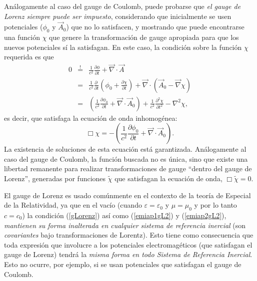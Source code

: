 Análogamente al caso del gauge de Coulomb, puede probarse que \textit{el gauge de Lorenz siempre puede ser impuesto}, considerando que inicialmente se usen potenciales ($\phi_0$ y $\vec{A}_0$) que no lo satisfacen, y mostrando que puede encontrarse una función $\chi$ que genere la transformación de gauge apropiada para que los nuevos potenciales sí la satisfagan. En este caso, la condición sobre la función $\chi$ requerida es que
\begin{eqnarray}
0&\stackrel{!}{=}&\frac{1}{c^2}\frac{\partial\phi}{\partial t}+\vec{\nabla}\cdot\vec{A} \\
&=&\frac{1}{c^2}\frac{\partial\ }{\partial t}\left(\phi_0+\frac{\partial\chi}{\partial t}\right)+\vec{\nabla}\cdot\left(\vec{A}_0-\vec\nabla\chi\right) \\
&=&\left(\frac{1}{c^2}\frac{\partial\phi_0}{\partial t} +\vec{\nabla}\cdot\vec{A}_0\right) +\frac{1}{c^2}\frac{\partial^2\chi }{\partial t^2}-\nabla^2\chi,
\end{eqnarray}
es decir, que satisfaga la ecuación de onda inhomogénea:
\begin{equation}
\Box\chi=-\left(\frac{1}{c^2}\frac{\partial\phi_0}{\partial t} +\vec{\nabla}\cdot\vec{A}_0\right).
\end{equation}
La existencia de soluciones de esta ecuación está garantizada. Análogamente al caso del gauge de Coulomb, la función buscada no es única, sino que existe una libertad remanente para realizar transformaciones de gauge ``dentro del gauge de Lorenz'', generadas por funciones $\tilde\chi$ que satisfagan la ecuación de onda, $\Box\tilde\chi=0$. 

El gauge de Lorenz es usado comúnmente en el contexto de la teoría de Especial de la Relatividad, ya que en el vacío (cuando $\varepsilon=\varepsilon_0$ y $\mu=\mu_0$ y por lo tanto $c=c_0$) la condición (\ref{gLorenz}) así como (\ref{emiap1gL2}) y (\ref{emiap2gL2}), \textit{mantienen su forma inalterada en cualquier sistema de referencia inercial} (son \textit{covariantes} bajo transformaciones de Lorentz). Esto tiene como consecuencia que toda expresión que involucre a los potenciales electromagéticos (que satisfagan el gauge de Lorenz) tendrá la \textit{misma forma en todo Sistema de Referencia Inercial}. Esto no ocurre, por ejemplo, si se usan potenciales que satisfagan el gauge de Coulomb.
